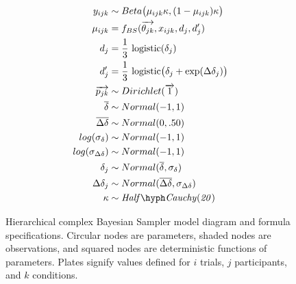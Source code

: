 \begin{figure}
\begin{minipage}{.5\textwidth}
\begin{tikzpicture}
\end{tikzpicture}
  \end{minipage}%
  \begin{minipage}{.5\textwidth}
    \flushleft
    \small
    \begin{align*}
  y_{ijk} &\sim Beta\big(\mu_{ijk} \kappa, (1-\mu_{ijk}) \kappa \big) \\
  \mu_{ijk} &= f_{BS}(\overrightarrow{\theta_{jk}}, x_{ijk}, d_j, d_j')  \\
  d_j &= \frac{1}{3} \ \text{logistic}(\delta_j) \\
  d_j' &= \frac{1}{3} \ \text{logistic}\big(\delta_j + \exp(\Delta\delta_j)\big) \\
  \overrightarrow{p_{jk}} &\sim Dirichlet(\overrightarrow{1}) \\
  \overline{\delta} &\sim Normal(-1, 1) \\
  \overline{\Delta\delta} &\sim Normal(0, .50) \\
  log(\sigma_{\delta}) &\sim Normal(-1, 1) \\
  log(\sigma_{\Delta\delta}) &\sim Normal(-1, 1) \\
  \delta_j &\sim Normal(\overline{\delta}, \sigma_{\delta}) \\
  \Delta\delta_j &\sim Normal(\overline{\Delta\delta}, \sigma_{\Delta\delta}) \\
  \kappa &\sim \mathit{Half \hyph Cauchy(20)} \\
\end{align*}

  \end{minipage}
  \caption{Hierarchical complex Bayesian Sampler model diagram and formula specifications. Circular nodes are parameters, shaded nodes are observations, and squared nodes are deterministic functions of parameters. Plates signify values defined for $i$ trials, $j$ participants, and $k$ conditions.}
\end{figure}

